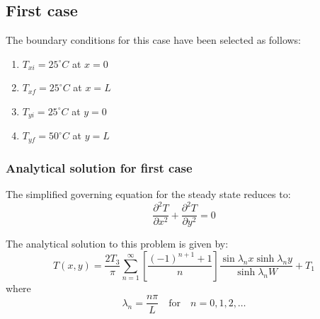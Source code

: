\documentclass[12pt,a4paper,fleqn]{article}
\begin{document}

\newpage

\subsection*{First case}

The boundary conditions for this case have been selected as follows:

\begin{enumerate}
\item $T_{xi}=25^{\circ}C$ at $x=0$
\item $T_{xf}=25^{\circ}C$ at $x=L$
\item $T_{yi}=25^{\circ}C$ at $y=0$
\item $T_{yf}=50^{\circ}C$ at $y=L$
\end{enumerate}

\subsubsection*{Analytical solution for first case}

The simplified governing equation for the steady state reduces to:
\begin{equation}
\frac{\partial^2T}{\partial x^2} + \frac{\partial^2T}{\partial y^2} = 0
\end{equation}

The analytical solution to this problem is given by:
\begin{equation}
T(x, y) =
\frac{2T_3}{\pi}\sum\limits_{n=1}^{\infty}\left[\frac{(-1)^{n+1}+1}{n}\right]
\frac{\sin\lambda_nx\sinh\lambda_ny}{\sinh\lambda_nW} + T_1\end{equation}
where
\begin{equation}
\lambda_n = \frac{n\pi}{L}\quad\text{for}\quad n = 0, 1, 2, \ldots 
\end{equation}
\end{document}
